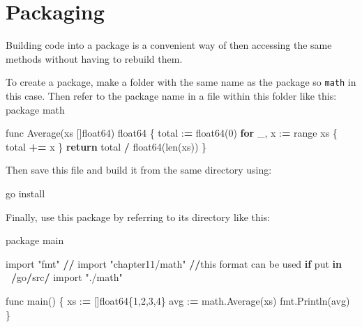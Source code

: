 \documentclass[]{book}
\newenvironment{Shaded}{\begin{snugshade}}{\end{snugshade}}
\newcommand{\BuiltInTok}[1]{#1}
\newcommand{\ControlFlowTok}[1]{\textcolor[rgb]{0.13,0.29,0.53}{\textbf{#1}}}
\newcommand{\DecValTok}[1]{\textcolor[rgb]{0.00,0.00,0.81}{#1}}
\newcommand{\ImportTok}[1]{#1}
\newcommand{\KeywordTok}[1]{\textcolor[rgb]{0.13,0.29,0.53}{\textbf{#1}}}
\newcommand{\NormalTok}[1]{#1}
\newcommand{\OperatorTok}[1]{\textcolor[rgb]{0.81,0.36,0.00}{\textbf{#1}}}
\newcommand{\StringTok}[1]{\textcolor[rgb]{0.31,0.60,0.02}{#1}}
\begin{document}
\hypertarget{packaging}{%
\section{Packaging}\label{packaging}}

Building code into a package is a convenient way of then accessing the same methods without having to rebuild them.

To create a package, make a folder with the same name as the package so \texttt{math} in this case. Then refer to the package name in a file within this folder like this:
package math

\begin{Shaded}
\begin{Highlighting}[]
\NormalTok{func Average(xs []float64) float64 \{}
\NormalTok{    total :}\OperatorTok{=}\NormalTok{ float64(}\DecValTok{0}\NormalTok{)             }
    \ControlFlowTok{for}\NormalTok{ _, x :}\OperatorTok{=} \BuiltInTok{range}\NormalTok{ xs \{          }
\NormalTok{        total }\OperatorTok{+=}\NormalTok{ x                  }
\NormalTok{    \}                               }
    \ControlFlowTok{return}\NormalTok{ total }\OperatorTok{/}\NormalTok{ float64(}\BuiltInTok{len}\NormalTok{(xs)) }
\NormalTok{\}                                   }
\end{Highlighting}
\end{Shaded}

Then save this file and build it from the same directory using:

\begin{Shaded}
\begin{Highlighting}[]
\NormalTok{go install}
\end{Highlighting}
\end{Shaded}

Finally, use this package by referring to its directory like this:

\begin{Shaded}
\begin{Highlighting}[]
\NormalTok{package main                          }
                                      
\ImportTok{import} \StringTok{"fmt"}                          
\OperatorTok{//} \ImportTok{import} \StringTok{"chapter11/math"} \OperatorTok{//}\NormalTok{this }\BuiltInTok{format}\NormalTok{ can be used }\ControlFlowTok{if}\NormalTok{ put }\KeywordTok{in} \OperatorTok{~/}\NormalTok{go}\OperatorTok{/}\NormalTok{src}\OperatorTok{/}
\ImportTok{import} \StringTok{"./math"}                       
                                      
\NormalTok{func main() \{                         }
\NormalTok{    xs :}\OperatorTok{=}\NormalTok{ []float64\{}\DecValTok{1}\NormalTok{,}\DecValTok{2}\NormalTok{,}\DecValTok{3}\NormalTok{,}\DecValTok{4}\NormalTok{\}          }
\NormalTok{    avg :}\OperatorTok{=}\NormalTok{ math.Average(xs)           }
\NormalTok{    fmt.Println(avg)                  }
\NormalTok{\}                                     }
\end{Highlighting}
\end{Shaded}
\end{document}
